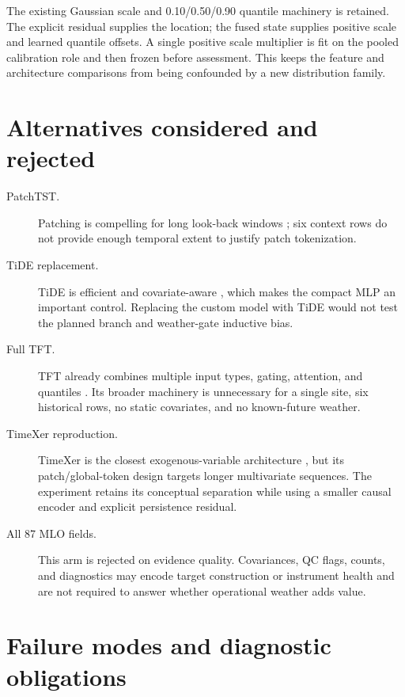 \documentclass[10pt]{article}
\begin{document}
The existing Gaussian scale and 0.10/0.50/0.90 quantile machinery is retained.
The explicit residual supplies the location; the fused state supplies
positive scale and learned quantile offsets. A single positive scale
multiplier is fit on the pooled calibration role and then frozen before
assessment. This keeps the feature and architecture comparisons from being
confounded by a new distribution family.

\section{Alternatives considered and rejected}

\begin{description}
\item[PatchTST.] Patching is compelling for long look-back windows
\cite{nie2023patchtst}; six context rows do not provide enough temporal extent
to justify patch tokenization.
\item[TiDE replacement.] TiDE is efficient and covariate-aware
\cite{das2024tide}, which makes the compact MLP an important control. Replacing
the custom model with TiDE would not test the planned branch and weather-gate
inductive bias.
\item[Full TFT.] TFT already combines multiple input types, gating, attention,
and quantiles \cite{lim2020tft}. Its broader machinery is unnecessary for a
single site, six historical rows, no static covariates, and no known-future
weather.
\item[TimeXer reproduction.] TimeXer is the closest exogenous-variable
architecture \cite{wang2024timexer}, but its patch/global-token design targets
longer multivariate sequences. The experiment retains its conceptual
separation while using a smaller causal encoder and explicit persistence
residual.
\item[All 87 MLO fields.] This arm is rejected on evidence quality. Covariances,
QC flags, counts, and diagnostics may encode target construction or instrument
health and are not required to answer whether operational weather adds value.
\end{description}

\section{Failure modes and diagnostic obligations}
\end{document}
